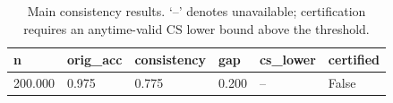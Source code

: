 \begin{table}[t]
\centering
\begin{tabular}{llllll}
\toprule
n & orig_acc & consistency & gap & cs_lower & certified \\
\midrule
200.000 & 0.975 & 0.775 & 0.200 & -- & False \\
\bottomrule
\end{tabular}
\caption{Main consistency results. `--' denotes unavailable; certification requires an anytime-valid CS lower bound above the threshold.}
\end{table}
